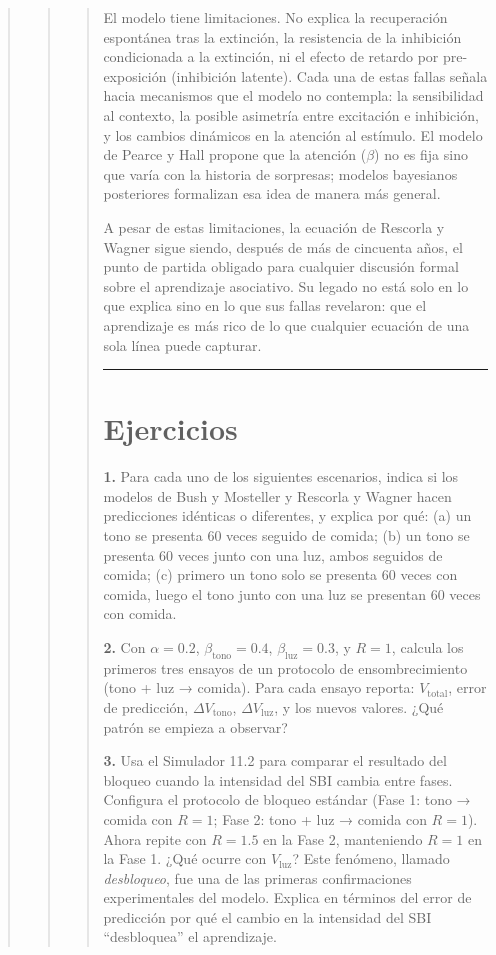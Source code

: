\documentclass[
  letterpaper,
  DIV=11,
  numbers=noendperiod]{scrreprt}
\begin{document}
\begin{tcolorbox}[enhanced jigsaw, toprule=.15mm, arc=.35mm, colback=white, opacityback=0, colframe=quarto-callout-note-color-frame, breakable, rightrule=.15mm, left=2mm, leftrule=.75mm, bottomrule=.15mm]
\begin{quote}
\begin{quote}
\begin{quote}
El modelo tiene limitaciones. No explica la recuperación espontánea tras
la extinción, la resistencia de la inhibición condicionada a la
extinción, ni el efecto de retardo por pre-exposición (inhibición
latente). Cada una de estas fallas señala hacia mecanismos que el modelo
no contempla: la sensibilidad al contexto, la posible asimetría entre
excitación e inhibición, y los cambios dinámicos en la atención al
estímulo. El modelo de Pearce y Hall propone que la atención (\(\beta\))
no es fija sino que varía con la historia de sorpresas; modelos
bayesianos posteriores formalizan esa idea de manera más general.

A pesar de estas limitaciones, la ecuación de Rescorla y Wagner sigue
siendo, después de más de cincuenta años, el punto de partida obligado
para cualquier discusión formal sobre el aprendizaje asociativo. Su
legado no está solo en lo que explica sino en lo que sus fallas
revelaron: que el aprendizaje es más rico de lo que cualquier ecuación
de una sola línea puede capturar.

\begin{center}\rule{0.5\linewidth}{0.5pt}\end{center}

\section{Ejercicios}\label{ejercicios-3}

\textbf{1.} Para cada uno de los siguientes escenarios, indica si los
modelos de Bush y Mosteller y Rescorla y Wagner hacen predicciones
idénticas o diferentes, y explica por qué: (a) un tono se presenta 60
veces seguido de comida; (b) un tono se presenta 60 veces junto con una
luz, ambos seguidos de comida; (c) primero un tono solo se presenta 60
veces con comida, luego el tono junto con una luz se presentan 60 veces
con comida.

\textbf{2.} Con \(\alpha = 0.2\), \(\beta_{\text{tono}} = 0.4\),
\(\beta_{\text{luz}} = 0.3\), y \(R = 1\), calcula los primeros tres
ensayos de un protocolo de ensombrecimiento (tono + luz → comida). Para
cada ensayo reporta: \(V_{\text{total}}\), error de predicción,
\(\Delta V_{\text{tono}}\), \(\Delta V_{\text{luz}}\), y los nuevos
valores. ¿Qué patrón se empieza a observar?

\textbf{3.} Usa el Simulador 11.2 para comparar el resultado del bloqueo
cuando la intensidad del SBI cambia entre fases. Configura el protocolo
de bloqueo estándar (Fase 1: tono → comida con \(R = 1\); Fase 2: tono +
luz → comida con \(R = 1\)). Ahora repite con \(R = 1.5\) en la Fase 2,
manteniendo \(R = 1\) en la Fase 1. ¿Qué ocurre con \(V_{\text{luz}}\)?
Este fenómeno, llamado \emph{desbloqueo}, fue una de las primeras
confirmaciones experimentales del modelo. Explica en términos del error
de predicción por qué el cambio en la intensidad del SBI ``desbloquea''
el aprendizaje.


\end{quote}
\end{quote}
\end{quote}
\end{tcolorbox}
\end{document}
